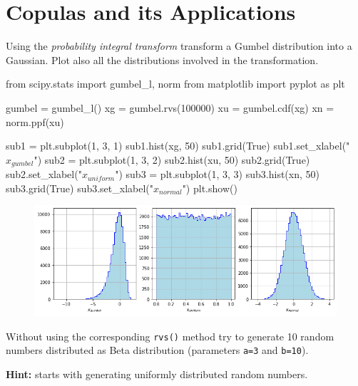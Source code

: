 \chapter{Copulas and its Applications}
\label{ex-copula}

\begin{question}
Using the \emph{probability integral transform} transform a Gumbel distribution into a Gaussian. Plot also all the distributions involved in the transformation.
\end{question}

\begin{solution}
\end{solution}

\begin{ipython}
from scipy.stats import gumbel_l, norm
from matplotlib import pyplot as plt

gumbel = gumbel_l()
xg = gumbel.rvs(100000)
xu = gumbel.cdf(xg)
xn = norm.ppf(xu)

sub1 = plt.subplot(1, 3, 1)
sub1.hist(xg, 50)
sub1.grid(True)
sub1.set_xlabel("$x_{gumbel}$")
sub2 = plt.subplot(1, 3, 2)
sub2.hist(xu, 50)
sub2.grid(True)
sub2.set_xlabel("$x_{uniform}$")
sub3 = plt.subplot(1, 3, 3)
sub3.hist(xn, 50)
sub3.grid(True)
sub3.set_xlabel("$x_{normal}$")
plt.show()
\end{ipython}

\begin{figure}[htbp]
\begin{center}
\includegraphics[width=0.7\linewidth]{figures/ex_gumbel_to_gauss.png}
\end{center}
\end{figure}

\begin{question}
Without using the corresponding \texttt{rvs()} method try to generate 10 random numbers distributed as Beta distribution (parameters \texttt{a=3} and \texttt{b=10}).

\noindent\textbf{Hint:} starts with generating uniformly distributed random numbers.
\end{question}	

\begin{solution}
\end{solution}

